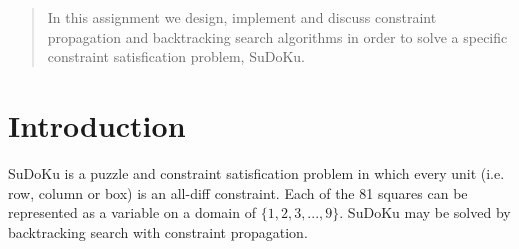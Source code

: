 \documentclass[12pt]{article}
\begin{document}
\maketitle

\begin{abstract}
In this assignment we design, implement and discuss constraint propagation and backtracking search algorithms in order to solve a specific constraint satisfication problem, SuDoKu. 
\end{abstract}

\section{Introduction}

SuDoKu is a puzzle and constraint satisfication problem in which every unit (i.e. row, column or box) is an all-diff constraint. Each of the 81 squares can be represented as a variable on a domain of $\{1, 2, 3, ..., 9\}$. SuDoKu may be solved by backtracking search with constraint propagation.







\end{document}
